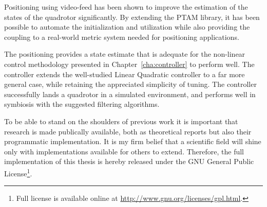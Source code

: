     Positioning using video-feed has been shown to improve the estimation of the states
    of the quadrotor significantly. By extending the PTAM library,
    it has been possible to automate the initialization and utilization
    while also providing the coupling to a real-world metric system needed
    for positioning applications.

    The positioning provides a state estimate that is adequate for the
    non-linear control methodology presented in Chapter~\ref{cha:controller}
    to perform well.
    The controller extends the well-studied Linear Quadratic controller to a far more general case,
    while retaining the appreciated simplicity of tuning.
    The controller successfully lands a quadrotor in a simulated environment,
    and performs well in symbiosis with the suggested filtering algorithms.


    \vspace{0.5cm}


    \noindent To be able to stand on the shoulders of previous work it is important
    that research is made publically available, both as theoretical reports
    but also their programmatic implementation.
    It is my firm belief that a scientific field will shine only
    with implementations available for others to extend.
    Therefore, the full implementation of this thesis is hereby
    released under the GNU General Public License\footnote{Full license is available online at \url{http://www.gnu.org/licenses/gpl.html}.}.
